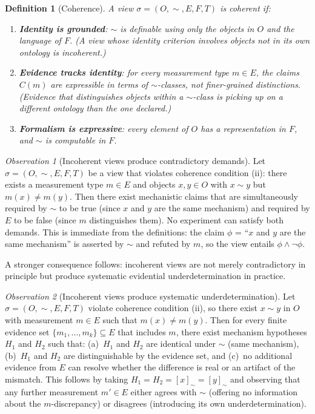 \documentclass[11pt]{article}
\newtheorem{definition}{Definition}[section]
\theoremstyle{remark}
\newtheorem{observation}{Observation}[section]
\newcommand{\view}{\sigma}
\begin{document}
\begin{definition}[Coherence]\label{def:coherence}
A view $\view = (O, {\sim}, E, F, T)$ is \emph{coherent} if:
\begin{enumerate}[leftmargin=*, label=(\roman*)]
\item \textbf{Identity is grounded}: $\sim$ is definable using only
      the objects in $O$ and the language of $F$.  (A view whose
      identity criterion involves objects not in its own ontology is
      incoherent.)
\item \textbf{Evidence tracks identity}: for every measurement type
      $m \in E$, the claims $C(m)$ are expressible in terms of $\sim$-classes,
      not finer-grained distinctions.  (Evidence that distinguishes objects
      within a $\sim$-class is picking up on a different ontology than
      the one declared.)
\item \textbf{Formalism is expressive}: every element of $O$ has a
      representation in $F$, and $\sim$ is computable in $F$.
\end{enumerate}
\end{definition}

\begin{observation}[Incoherent views produce contradictory demands]\label{prop:incoherence}
Let $\view = (O, {\sim}, E, F, T)$ be a view that violates coherence
condition (ii): there exists a measurement type $m \in E$ and objects
$x, y \in O$ with $x \sim y$ but $m(x) \neq m(y)$.  Then there exist
mechanistic claims that are simultaneously required by $\sim$ to be true
(since $x$ and $y$ are the same mechanism) and required by $E$ to be
false (since $m$ distinguishes them).  No experiment can satisfy both
demands.  This is immediate from the definitions: the claim $\phi$ =
``$x$ and $y$ are the same mechanism'' is asserted by $\sim$ and refuted
by $m$, so the view entails $\phi \wedge \neg\phi$.
\end{observation}

A stronger consequence follows: incoherent views are not merely
contradictory in principle but produce systematic evidential
underdetermination in practice.

\begin{observation}[Incoherent views produce systematic underdetermination]\label{prop:underdet}
Let $\view = (O, {\sim}, E, F, T)$ violate coherence condition (ii),
so there exist $x \sim y$ in $O$ with measurement $m \in E$ such that
$m(x) \neq m(y)$.  Then for every finite evidence set
$\{m_1, \ldots, m_k\} \subseteq E$ that includes $m$, there exist
mechanism hypotheses $H_1$ and $H_2$ such that: (a)~$H_1$ and $H_2$
are identical under $\sim$ (same mechanism), (b)~$H_1$ and $H_2$ are
distinguishable by the evidence set, and (c)~no additional evidence
from $E$ can resolve whether the difference is real or an artifact
of the mismatch.  This follows by taking $H_1 = H_2 = [x]_\sim =
[y]_\sim$ and observing that any further measurement $m' \in E$ either
agrees with $\sim$ (offering no information about the $m$-discrepancy)
or disagrees (introducing its own underdetermination).
\end{observation}
\end{document}
